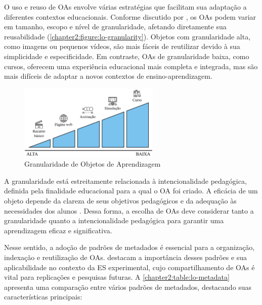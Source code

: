 O uso e reuso de OAs envolve várias estratégias que facilitam sua adaptação a diferentes contextos educacionais. Conforme discutido por , os OAs podem variar em tamanho, escopo e nível de granularidade, afetando diretamente sua reusabilidade (\autoref{chapter2:figure:lo-granularity}). Objetos com granularidade alta, como imagens ou pequenos vídeos, são mais fáceis de reutilizar devido à sua simplicidade e especificidade. Em contraste, OAs de granularidade baixa, como cursos, oferecem uma experiência educacional mais completa e integrada, mas são mais difíceis de adaptar a novos contextos de ensino-aprendizagem.

\begin{figure}[htb]
\centering
\caption{Granularidade de Objetos de Aprendizagem}
\label{chapter2:figure:lo-granularity}
\includegraphics[width=0.6\textwidth]{images/chapter2-lo-granularity.jpg}
\end{figure}

A granularidade está estreitamente relacionada à intencionalidade pedagógica, definida pela finalidade educacional para a qual o OA foi criado. A eficácia de um objeto depende da clareza de seus objetivos pedagógicos e da adequação às necessidades dos alunos \cite{Bloom1984}. Dessa forma, a escolha de OAs deve considerar tanto a granularidade quanto a intencionalidade pedagógica para garantir uma aprendizagem eficaz e significativa.

Nesse sentido, a adoção de padrões de metadados é essencial para a organização, indexação e reutilização de OAs.  destacam a importância desses padrões e sua aplicabilidade no contexto da ES experimental, cujo compartilhamento de OAs é vital para replicações e pesquisas futuras. A \autoref{chapter2:table:lo-metadata} apresenta uma comparação entre vários padrões de metadados, destacando suas características principais:

